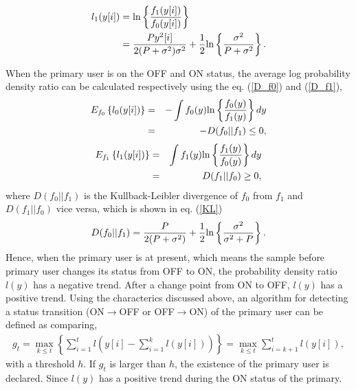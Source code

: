 \begin{align}
l_{1}(y[i]) &= {\rm ln}\left\{\frac{f_1(y[i])}{f_0(y[i])}\right\} \label{like2} \\ 
&=\frac{Py^2[i]}{2(P+\sigma^2)\sigma^2} + \frac{1}{2}{\rm ln}\left\{\frac{\sigma^2}{P+\sigma^2}\right\}. \nonumber
\end{align}

When the primary user is on the OFF and ON status, the average log probability density ratio can be calculated respectively using the eq. (\ref{D_f0}) and (\ref{D_f1}),
\begin{eqnarray}
E_{f_0}\left\{l_0(y[i])\right\} &=& -\int f_0(y){\rm ln}\left\{\frac{f_0(y)}{f_1(y)}\right\}dy \nonumber \\ 
&=&-D(f_0||f_1)\leq 0, \label{D_f0} 
\end{eqnarray}
\begin{eqnarray}
E_{f_1}\left\{l_1(y[i])\right\} &=& \int f_1(y){\rm ln}\left\{\frac{f_1(y)}{f_0(y)}\right\}dy \nonumber \\
&=& D(f_1||f_0)\geq 0 \label{D_f1},
\end{eqnarray}
where $D(f_0||f_1)$ is the Kullback-Leibler divergence of $f_0$ from $f_1$ and $D(f_1||f_0)$ vice versa, which is shown in eq. (\ref{KL})
\begin{eqnarray}
D(f_0||f_1)=\frac{P}{2(P+\sigma^2)}+\frac{1}{2}{\rm ln}\left\{\frac{\sigma^2}{\sigma^2+P}\right\}.
\label{KL}
\end{eqnarray}
Hence, when the primary user is at present, which means the sample before primary user changes its status from OFF to ON, the probability density ratio $l(y)$ has a negative trend. After a change point from ON to OFF, $l(y)$ has a positive trend.
Using the characterics discussed above, an algorithm for detecting a status transition (ON$\rightarrow$OFF or OFF$\rightarrow$ON) of the primary user can be defined as comparing,  
\begin{eqnarray}
g_t =  \max_{k \leq t}\left\{\sum_{i=1}^tl(y[i]-\sum_{i=1}^kl(y[i]))\right\}=\max_{k \leq t}\sum_{i=k+1}^tl(y[i]),
\label{Cusum}
\end{eqnarray}
with a threshold $h$. If $g_t$ is larger than $h$, the existence of the primary user is declared. Since $l(y)$ has a positive trend during the ON status of the primary.

